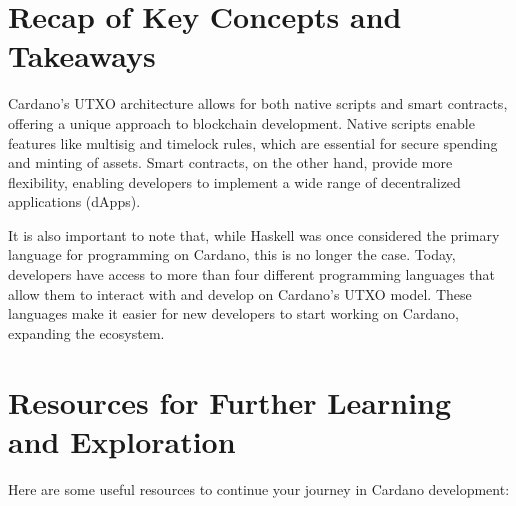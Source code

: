 
\section{Recap of Key Concepts and Takeaways}
Cardano’s UTXO architecture allows for both native scripts and smart contracts, offering a unique approach to blockchain development. Native scripts enable features like multisig and timelock rules, which are essential for secure spending and minting of assets. Smart contracts, on the other hand, provide more flexibility, enabling developers to implement a wide range of decentralized applications (dApps).

It is also important to note that, while Haskell was once considered the primary language for programming on Cardano, this is no longer the case. Today, developers have access to more than four different programming languages that allow them to interact with and develop on Cardano’s UTXO model. These languages make it easier for new developers to start working on Cardano, expanding the ecosystem.

\section{Resources for Further Learning and Exploration}
Here are some useful resources to continue your journey in Cardano development:

